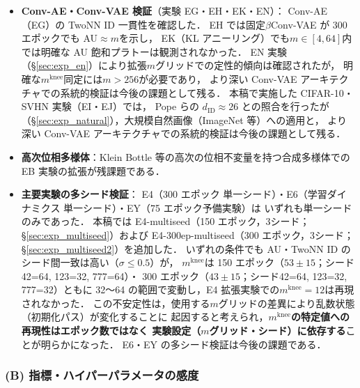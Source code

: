 \documentclass[11pt,a4paper]{jsarticle}
\newcommand{\mknee}{m^{\mathrm{knee}}}
\begin{document}
\begin{itemize}
  \item \textbf{Conv-AE・Conv-VAE 検証}（実験 EG・EH・EK・EN）：
        Conv-AE（EG）の TwoNN ID 一貫性を確認した．
        EH では固定$\beta$Conv-VAE が 300 エポックでも AU$\approx m$を示し，
        EK（KL アニーリング）でも$m\in[4,64]$内では明確な AU 飽和プラトーは観測されなかった．
        EN 実験（§\ref{sec:exp_en}）により拡張$m$グリッドでの定性的傾向は確認されたが，
        明確な$\mknee$同定には$m>256$が必要であり，
        より深い Conv-VAE アーキテクチャでの系統的検証は今後の課題として残る．
        本稿で実施した CIFAR-10・SVHN 実験（EI・EJ）では，
        Pope ら\cite{pope2021intrinsic}の $d_\mathrm{ID} \approx 26$ との照合を行ったが
        （§\ref{sec:exp_natural}），大規模自然画像（ImageNet 等）への適用と，
        より深い Conv-VAE アーキテクチャでの系統的検証は今後の課題として残る．
  \item \textbf{高次位相多様体}：Klein Bottle 等の高次の位相不変量を持つ合成多様体での
        EB 実験の拡張が残課題である．
  \item \textbf{主要実験の多シード検証}：
        E4（300 エポック 単一シード）・E6（学習ダイナミクス 単一シード）・EY（75 エポック予備実験）は
        いずれも単一シードのみであった．
        本稿では E4-multiseed（150 エポック，3シード；§\ref{sec:exp_multiseed}）および
        E4-300ep-multiseed（300 エポック，3シード；§\ref{sec:exp_multiseed2}）を追加した．
        いずれの条件でも AU・TwoNN ID のシード間一致は高い（$\sigma \leq 0.5$）が，
        $\mknee$は 150 エポック（$53 \pm 15$；シード42=64, 123=32, 777=64）・
        300 エポック（$43 \pm 15$；シード42=64, 123=32, 777=32）ともに
        32〜64 の範囲で変動し，E4 拡張実験での$\mknee = 12$は再現されなかった．
        この不安定性は，使用する$m$グリッドの差異により乱数状態（初期化パス）が変化することに
        起因すると考えられ，\textbf{$\mknee$の特定値への再現性はエポック数ではなく
        実験設定（$m$グリッド・シード）に依存する}ことが明らかになった．
        E6・EY の多シード検証は今後の課題である．
\end{itemize}

\subsubsection*{(B) 指標・ハイパーパラメータの感度}
\end{document}
